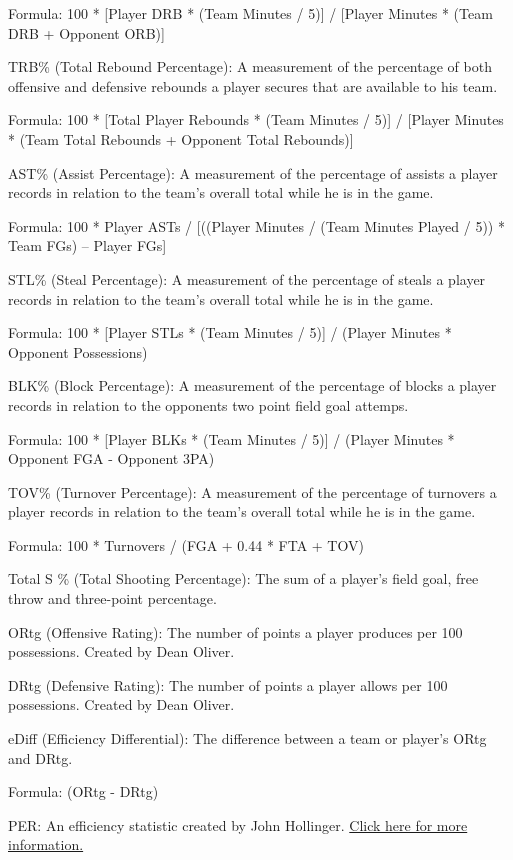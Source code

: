 \documentclass[]{article}
\begin{document}
Formula: 100 * {[}Player DRB * (Team Minutes / 5){]} / {[}Player Minutes
* (Team DRB + Opponent ORB){]}

TRB\% (Total Rebound Percentage): A measurement of the percentage of
both offensive and defensive rebounds a player secures that are
available to his team.

Formula: 100 * {[}Total Player Rebounds * (Team Minutes / 5){]} /
{[}Player Minutes * (Team Total Rebounds + Opponent Total Rebounds){]}

AST\% (Assist Percentage): A measurement of the percentage of assists a
player records in relation to the team's overall total while he is in
the game.~

Formula: 100 * Player ASTs / {[}((Player Minutes / (Team Minutes Played
/ 5)) * Team FGs) -- Player FGs{]}

STL\% (Steal Percentage): A measurement of the percentage of steals a
player records in relation to the team's overall total while he is in
the game.

Formula: 100 * {[}Player STLs * (Team Minutes / 5){]} / (Player Minutes
* Opponent Possessions)

BLK\% (Block Percentage): A measurement of the percentage of blocks a
player records in relation to the opponents two point field goal
attemps.

Formula: 100 * {[}Player BLKs * (Team Minutes / 5){]} / (Player Minutes
* Opponent FGA - Opponent 3PA)

TOV\% (Turnover Percentage): A measurement of the percentage of
turnovers a player records in relation to the team's overall total while
he is in the game.

Formula: 100 * Turnovers / (FGA + 0.44 * FTA + TOV)

Total S \% (Total Shooting Percentage): The sum of a player's field
goal, free throw and three-point percentage.

ORtg (Offensive Rating): The number of points a player produces per 100
possessions. Created by Dean Oliver.

DRtg (Defensive Rating): The number of points a player allows per 100
possessions. Created by Dean Oliver.

eDiff (Efficiency Differential): The difference between a team or
player's ORtg and DRtg.

Formula: (ORtg - DRtg)

PER: An efficiency statistic created by John Hollinger.
\href{https://en.wikipedia.org/wiki/Player_efficiency_rating}{Click here
for more information.}
\end{document}
